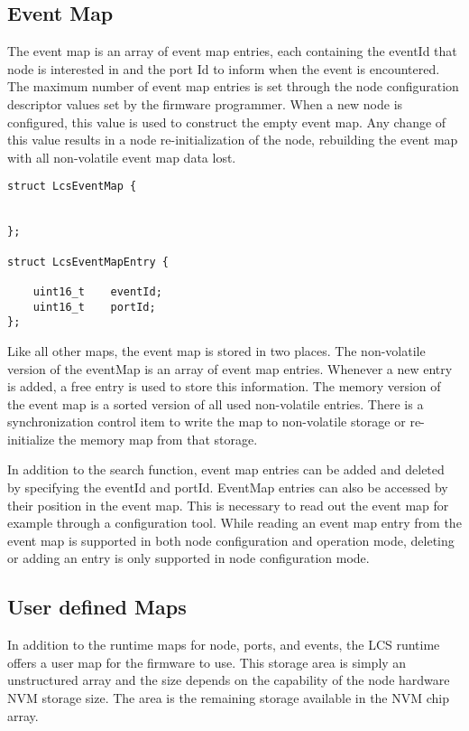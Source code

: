 \subsection{Event Map}

The event map is an array of event map entries, each containing the eventId that node is interested in and the port Id to inform when the event is encountered. The maximum number of event map entries is set through the node configuration descriptor values set by the firmware programmer. When a new node is configured, this value is used to construct the empty event map. Any change of this value results in a node re-initialization of the node, rebuilding the event map with all non-volatile event map data lost.

\lstset{language=c++, style=codesnippetstyle}
\begin{lstlisting}
struct LcsEventMap {


};

struct LcsEventMapEntry {

    uint16_t	eventId;
    uint16_t 	portId;
};
\end{lstlisting}
\FloatBarrier

Like all other maps, the event map is stored in two places. The non-volatile version of the eventMap is an array of event map entries. Whenever a new entry is added, a free entry is used to store this information. The memory version of the event map is a sorted version of all used non-volatile entries. There is a synchronization control item to write the map to non-volatile storage or re-initialize the memory map from that storage.

In addition to the search function, event map entries can be added and deleted by specifying the eventId and portId. EventMap entries can also be accessed by their position in the event map. This is necessary to read out the event map for example through a configuration tool. While reading an event map entry from the event map is supported in both node configuration and operation mode, deleting or adding an entry is only supported in node configuration mode.

\subsection{User defined Maps}

In addition to the runtime maps for node, ports, and events, the LCS runtime offers a user map for the firmware to use. This storage area is simply an unstructured array and the size depends on the capability of the node hardware NVM storage size. The area is the remaining storage available in the NVM chip array.

